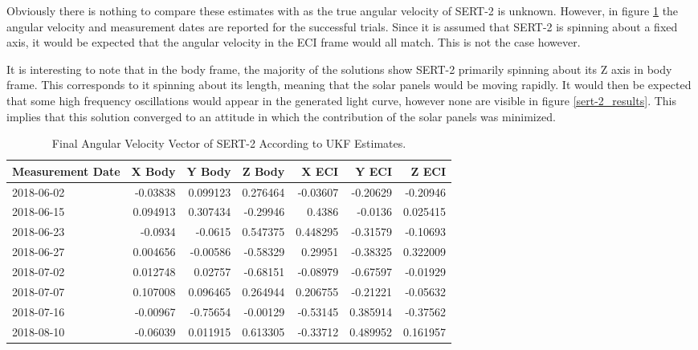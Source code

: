 Obviously there is nothing to compare these estimates with as the true angular velocity of SERT-2 is unknown. However, in figure \ref{sert_table} the angular velocity and measurement dates are reported for the successful trials. Since it is assumed that SERT-2 is spinning about a fixed axis, it would be expected that the angular velocity in the ECI frame would all match. This is not the case however.

It is interesting to note that in the body frame, the majority of the solutions show SERT-2 primarily spinning about its Z axis in body frame. This corresponds to it spinning about its length, meaning that the solar panels would be moving rapidly. It would then be expected that some high frequency oscillations would appear in the generated light curve, however none are visible in figure \ref{sert-2_results}. This implies that this solution converged to an attitude in which the contribution of the solar panels was minimized.

\begin{table}[H]\label{sert_table}
	\centering
	
	\begin{tabular}{|l|r|r|r|r|r|r|}
		\hline Measurement Date & X Body & Y Body & Z Body & X ECI & Y ECI & Z ECI \\
		\hline 2018-06-02 & -0.03838 & 0.099123 & 0.276464 & -0.03607 & -0.20629 & -0.20946 \\
		\hline 2018-06-15 & 0.094913 & 0.307434 & -0.29946 & 0.4386 & -0.0136 & 0.025415 \\
		\hline 2018-06-23 & -0.0934 & -0.0615 & 0.547375 & 0.448295 & -0.31579 & -0.10693 \\
		\hline 2018-06-27 & 0.004656 & -0.00586 & -0.58329 & 0.29951 & -0.38325 & 0.322009 \\
		\hline 2018-07-02 & 0.012748 & 0.02757 & -0.68151 & -0.08979 & -0.67597 & -0.01929 \\
		\hline 2018-07-07 & 0.107008 & 0.096465 & 0.264944 & 0.206755 & -0.21221 & -0.05632 \\
		\hline 2018-07-16 & -0.00967 & -0.75654 & -0.00129 & -0.53145 & 0.385914 & -0.37562 \\
		\hline 2018-08-10 & -0.06039 & 0.011915 & 0.613305 & -0.33712 & 0.489952 & 0.161957 \\
		\hline 
	\end{tabular}%
	\caption{Final Angular Velocity Vector of SERT-2 According to UKF Estimates.}
\end{table}%


